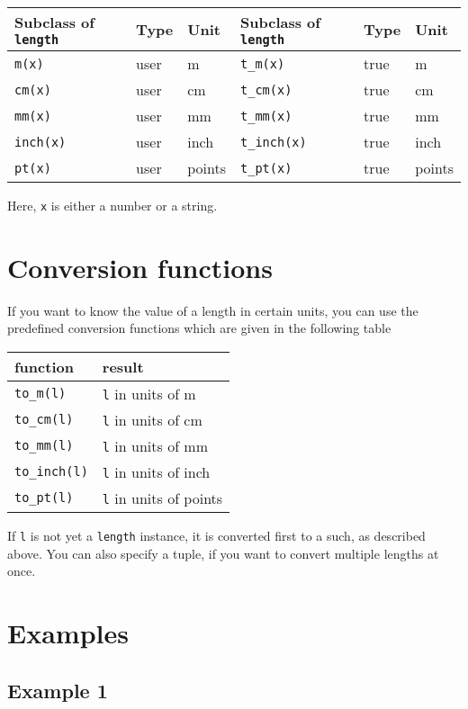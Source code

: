 \medskip
\begin{center}
\begin{tabular}{lll|lll}
Subclass of \texttt{length} & Type & Unit & Subclass of \texttt{length} & Type & Unit\\
\hline
\texttt{m(x)} & user & m & \texttt{t\_m(x)} & true & m\\
\texttt{cm(x)} & user & cm & \texttt{t\_cm(x)} & true & cm\\
\texttt{mm(x)} & user & mm & \texttt{t\_mm(x)} & true & mm\\
\texttt{inch(x)} & user & inch & \texttt{t\_inch(x)} & true & inch\\
\texttt{pt(x)} & user & points & \texttt{t\_pt(x)} & true & points\\
\end{tabular}
\end{center}
\medskip
Here, \verb|x| is either a number or a string.

\section{Conversion functions}
If you want to know the value of a \PyX{} length in certain units, you
can use the predefined conversion functions which are given in the
following table
\begin{center}
\begin{tabular}{ll}
function & result \\
\hline
\texttt{to\_m(l)} & \texttt{l} in units of m\\
\texttt{to\_cm(l)} & \texttt{l} in units of cm\\
\texttt{to\_mm(l)} & \texttt{l} in units of mm\\
\texttt{to\_inch(l)} & \texttt{l} in units of inch\\
\texttt{to\_pt(l)} & \texttt{l} in units of points\\
\end{tabular}
\end{center}
If \verb|l| is not yet a \verb|length| instance, it is converted first
to a such, as described above. You can also specify a tuple, if you
want to convert multiple lengths at once.


\section{Examples}


\subsection{Example 1}



